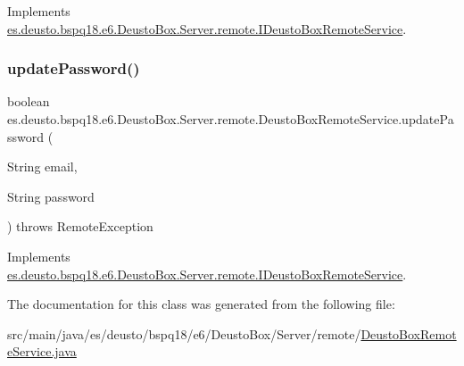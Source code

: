 Implements \mbox{\hyperlink{interfacees_1_1deusto_1_1bspq18_1_1e6_1_1_deusto_box_1_1_server_1_1remote_1_1_i_deusto_box_remote_service_ab3adf6a3ab12372cf306b30b3fd98636}{es.\+deusto.\+bspq18.\+e6.\+Deusto\+Box.\+Server.\+remote.\+I\+Deusto\+Box\+Remote\+Service}}.

\mbox{\label{classes_1_1deusto_1_1bspq18_1_1e6_1_1_deusto_box_1_1_server_1_1remote_1_1_deusto_box_remote_service_ae0e6d493d943f30b092a6041d0d3328e}} 
\subsubsection{\texorpdfstring{update\+Password()}{updatePassword()}}
{\footnotesize\ttfamily boolean es.\+deusto.\+bspq18.\+e6.\+Deusto\+Box.\+Server.\+remote.\+Deusto\+Box\+Remote\+Service.\+update\+Password (\begin{DoxyParamCaption}\item[{String}]{email,  }\item[{String}]{password }\end{DoxyParamCaption}) throws Remote\+Exception}



Implements \mbox{\hyperlink{interfacees_1_1deusto_1_1bspq18_1_1e6_1_1_deusto_box_1_1_server_1_1remote_1_1_i_deusto_box_remote_service_aa73e5a3a839d93e49a0f0005e54e3e07}{es.\+deusto.\+bspq18.\+e6.\+Deusto\+Box.\+Server.\+remote.\+I\+Deusto\+Box\+Remote\+Service}}.



The documentation for this class was generated from the following file\+:\begin{DoxyCompactItemize}
\item 
src/main/java/es/deusto/bspq18/e6/\+Deusto\+Box/\+Server/remote/\mbox{\hyperlink{_deusto_box_remote_service_8java}{Deusto\+Box\+Remote\+Service.\+java}}\end{DoxyCompactItemize}
